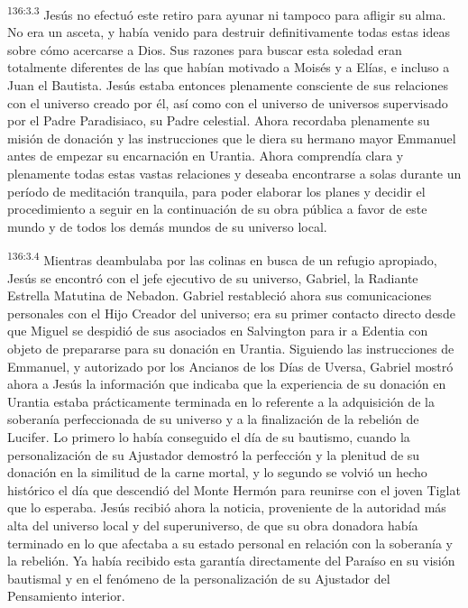 \par
\textsuperscript{136:3.3} Jesús no efectuó este retiro para ayunar ni tampoco para afligir su alma. No era un asceta, y había venido para destruir definitivamente todas estas ideas sobre cómo acercarse a Dios. Sus razones para buscar esta soledad eran totalmente diferentes de las que habían motivado a Moisés y a Elías, e incluso a Juan el Bautista. Jesús estaba entonces plenamente consciente de sus relaciones con el universo creado por él, así como con el universo de universos supervisado por el Padre Paradisiaco, su Padre celestial. Ahora recordaba plenamente su misión de donación y las instrucciones que le diera su hermano mayor Emmanuel antes de empezar su encarnación en Urantia. Ahora comprendía clara y plenamente todas estas vastas relaciones y deseaba encontrarse a solas durante un período de meditación tranquila, para poder elaborar los planes y decidir el procedimiento a seguir en la continuación de su obra pública a favor de este mundo y de todos los demás mundos de su universo local.

\par
\textsuperscript{136:3.4} Mientras deambulaba por las colinas en busca de un refugio apropiado, Jesús se encontró con el jefe ejecutivo de su universo, Gabriel, la Radiante Estrella Matutina de Nebadon. Gabriel restableció ahora sus comunicaciones personales con el Hijo Creador del universo; era su primer contacto directo desde que Miguel se despidió de sus asociados en Salvington para ir a Edentia con objeto de prepararse para su donación en Urantia. Siguiendo las instrucciones de Emmanuel, y autorizado por los Ancianos de los Días de Uversa, Gabriel mostró ahora a Jesús la información que indicaba que la experiencia de su donación en Urantia estaba prácticamente terminada en lo referente a la adquisición de la soberanía perfeccionada de su universo y a la finalización de la rebelión de Lucifer. Lo primero lo había conseguido el día de su bautismo, cuando la personalización de su Ajustador demostró la perfección y la plenitud de su donación en la similitud de la carne mortal, y lo segundo se volvió un hecho histórico el día que descendió del Monte Hermón para reunirse con el joven Tiglat que lo esperaba. Jesús recibió ahora la noticia, proveniente de la autoridad más alta del universo local y del superuniverso, de que su obra donadora había terminado en lo que afectaba a su estado personal en relación con la soberanía y la rebelión. Ya había recibido esta garantía directamente del Paraíso en su visión bautismal y en el fenómeno de la personalización de su Ajustador del Pensamiento interior.

